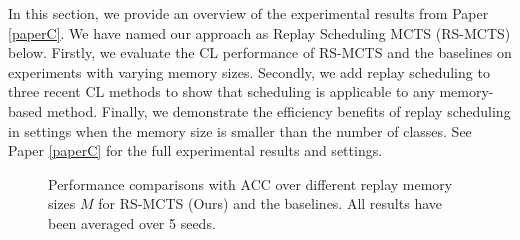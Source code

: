 In this section, we provide an overview of the experimental results from Paper \ref{paperC}. We have named our approach as Replay Scheduling MCTS (RS-MCTS) below. Firstly, we evaluate the CL performance of RS-MCTS and the baselines on experiments with varying memory sizes. Secondly, we add replay scheduling to three recent CL methods to show that scheduling is applicable to any memory-based method. Finally, we demonstrate the efficiency benefits of replay scheduling in settings when the memory size is smaller than the number of classes. See Paper \ref{paperC} for the full experimental results and settings. 


\vspace{-3mm}
\begin{figure}
	\centering
	\setlength{\figwidth}{0.36\textwidth}
	\setlength{\figheight}{.16\textheight}
	\vspace{-3mm}
	\hspace{-11mm}
	\resizebox{0.58\textwidth}{!}{
	
	}
	\vspace{-7mm}
	\captionsetup{width=.9\linewidth}
	\caption{Performance comparisons with ACC over different replay memory sizes $M$ for RS-MCTS (Ours) and the baselines. All results have been averaged over 5 seeds. %
}
\vspace{-3mm}
\label{fig:acc_over_replay_memory_size}
\end{figure}
